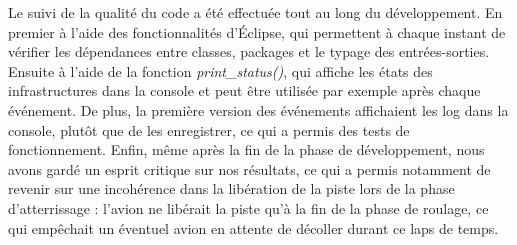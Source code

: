 Le suivi de la qualité du code a été effectuée tout au long du développement. En premier à l'aide des fonctionnalités d’Éclipse, qui permettent à chaque instant de vérifier les dépendances entre classes, packages et le typage des entrées-sorties. Ensuite à l'aide de la fonction \textit{print\_status()}, qui affiche les états des infrastructures dans la console et peut être utilisée par exemple après chaque événement. De plus, la première version des événements affichaient les log dans la console, plutôt que de les enregistrer, ce qui a permis des tests de fonctionnement.
Enfin, même après la fin de la phase de développement, nous avons gardé un esprit critique sur nos résultats, ce qui a permis notamment de revenir sur une incohérence dans la libération de la piste lors de la phase d'atterrissage : l'avion ne libérait la piste qu'à la fin de la phase de roulage, ce qui empêchait un éventuel avion en attente de décoller durant ce laps de temps.
